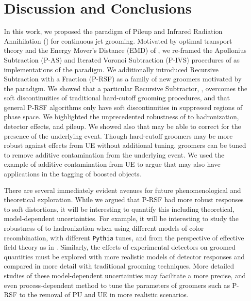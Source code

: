 \documentclass[letterpaper,11pt]{article}
\begin{document}
\section{Discussion and Conclusions}
\label{sec:Conclusions}

In this work, we proposed the paradigm of Pileup and Infrared Radiation Annihilation (\PIRANHA{}) for continuous jet grooming.
%
Motivated by optimal transport theory and the Energy Mover's Distance (EMD) of , we re-framed the Apollonius Subtraction (P-AS) and Iterated Voronoi Subtraction (P-IVS) procedures of  as implementations of the \PIRANHA{} paradigm.
%
We additionally introduced Recursive Subtraction with a Fraction (P-RSF) as a family of new groomers motivated by the \PIRANHA{} paradigm.
%
We showed that a particular Recursive Subtractor, , overcomes the soft discontinuities of traditional hard-cutoff grooming procedures, and that general P-RSF algorithms only have soft discontinuities in suppressed regions of phase space.
%
We highlighted the unprecedented robustness of  to hadronization, detector effects, and pileup.
%
We showed also that  may be able to correct for the presence of the underlying event.
%
Though hard-cutoff groomers may be more robust against effects from UE without additional tuning, \PIRANHA{} groomers can be tuned to remove additive contamination from the underlying event.
%
We used the example of additive contamination from UE to argue that \PIRANHA{} may also have applications in the tagging of boosted objects.

   There are several immediately evident avenues for future phenomenological and theoretical exploration.
    While we argued that P-RSF had more robust responses to soft distortions, it will be interesting to quantify this including theoretical, model-dependent uncertainties.
   For example, it will be interesting to study the robustness of  to hadronization when using different models of color recombination, with different \texttt{Pythia} tunes, and from the perspective of effective field theory as in .
   Similarly, the effects of experimental detectors on  groomed quantities must be explored with more realistic models of detector responses and compared in more detail with traditional grooming techniques.
   More detailed studies of these model-dependent uncertainties may facilitate a more precise, and even process-dependent method to tune the parameters of \PIRANHA{} groomers such as P-RSF to the removal of PU and UE in more realistic scenarios.
\end{document}
